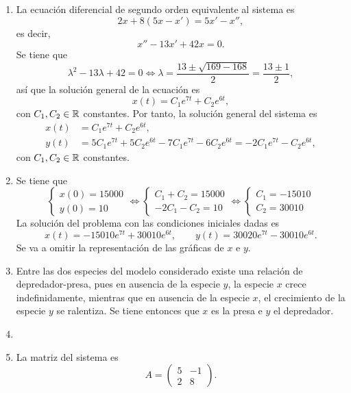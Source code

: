 \documentclass[11pt]{report}
\begin{document}
\begin{solution}
    \hfill
    \begin{enumerate}
        \item La ecuación diferencial de segundo orden equivalente al sistema es
        \[2x+8(5x-x') = 5x'-x'',\]
        es decir,
        \[x'' - 13x' + 42x = 0.\]
        Se tiene que
        \[\lambda^2-13\lambda +42 = 0 \iff \lambda = \frac{13\pm\sqrt{169-168}}{2} = \frac{13\pm 1}{2},\]
        así que la solución general de la ecuación es
        \[x(t) = C_1e^{7t}+C_2e^{6t},\]
        con $C_1,C_2\in\mathbb R$ constantes. Por tanto, la solución general del sistema es
        \begin{align*}
            x(t) &= C_1e^{7t}+C_2e^{6t}, \\
            y(t) &= 5C_1e^{7t}+5C_2e^{6t}-7C_1e^{7t}-6C_2e^{6t} = -2C_1e^{7t}-C_2e^{6t},
        \end{align*}
        con $C_1,C_2\in\mathbb R$ constantes.
        \item Se tiene que
        \[\begin{cases}
            x(0)=15000 \\
            y(0) = 10
        \end{cases} \iff \begin{cases}
            C_1+C_2 = 15000 \\
            -2C_1-C_2 = 10 
        \end{cases} \iff \begin{cases}
            C_1 = -15010 \\
            C_2 = 30010
        \end{cases}\]
        La solución del problema con las condiciones iniciales dadas es
        \[x(t) = -15010e^{7t} + 30010e^{6t}, \qquad y(t) = 30020e^{7t}-30010e^{6t}.\]
        Se va a omitir la representación de las gráficas de $x$ e $y$.
        \item Entre las dos especies del modelo considerado existe una relación de depredador-presa, pues en ausencia de la especie $y$, la especie $x$ crece indefinidamente, mientras que en ausencia de la especie $x$, el crecimiento de la especie $y$ se ralentiza. Se tiene entonces que $x$ es la presa e $y$ el depredador.
        \item 
        \item La matriz del sistema es
        \[A = \left(\begin{array}{cc}
            5 & -1 \\
            2 & 8
        \end{array}\right).\]

\end{enumerate}
\end{solution}
\end{document}

